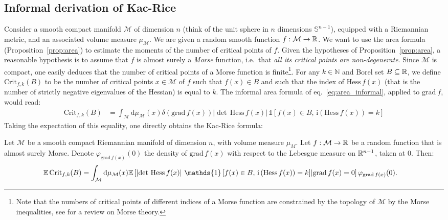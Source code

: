 \documentclass[amsmath,amssymb,nofootinbib,prd]{article}
\begin{document}
	\subsection{Informal derivation of Kac-Rice}
	
	Consider a smooth compact manifold $\mathcal{M}$ of dimension $n$ (think of the unit sphere in $n$ dimensions $\mathbb{S}^{n-1}$), equipped with a Riemannian metric, and an associated volume measure $\mu_{\mathcal{M}}$. 
	We are given a random smooth function $f : \mathcal{M} \to \mathbb{R}$. 
	We want to use the area formula (Proposition~\ref{prop:area}) to estimate the moments of the number of critical points of $f$.  
	Given the hypotheses of Proposition~\ref{prop:area}, a reasonable hypothesis is to assume that $f$ is almost surely a \emph{Morse} function, i.e.\ that \emph{all its critical points are non-degenerate}. 
	Since $\mathcal{M}$ is compact, one easily deduces that the number of critical points of a Morse function is finite\footnote{Note that the numbers of critical points of different indices of a Morse function are constrained by the topology of $\mathcal{M}$ by the Morse inequalities, see \cite{milnor1963morse} for a review on Morse theory.}. 
	For any $k \in \mathbb{N}$ and Borel set $B \subseteq \mathbb{R}$, we define $\mathrm{Crit}_{f,k}(B)$ to be the number of critical points $x \in \mathcal{M}$ of $f$ such that $f(x) \in B$
	 and such that the index of $\mathrm{Hess}\, f(x)$ (that is the number of strictly negative eigenvalues of the Hessian) is equal to $k$. 
	 The informal area formula of eq.~\eqref{eq:area_informal}, applied to $\mathrm{grad}\ f$, would read:
	\begin{align}
	\mathrm{Crit}_{f,k}(B) &= \int_{\mathcal{M}} \mathrm{d}\mu_{\mathcal{M}}(x) \delta\left(\mathrm{grad}\, f(x)\right) \left|\det \, \mathrm{Hess}\, f(x)\right| \, \mathds{1}\left[f(x) \in B,\, \mathrm{i}\left(\mathrm{Hess}\, f(x)\right) = k\right]
	\end{align}
	Taking the expectation of this equality, one directly obtains the Kac-Rice formula:
	\begin{proposition}\label{prop:KR}Let $\mathcal{M}$ be a smooth compact Riemannian manifold of dimension $n$, with volume measure $\mathcal{\mu}_M$. Let $f : \mathcal{M} \to \mathbb{R}$ be a random function 
		that is almost surely Morse.
		Denote  $\varphi_{\mathrm{grad}\, f(x)}(0)$ the density of $\mathrm{grad}\, f(x)$ with respect to the Lebesgue measure on $\mathbb{R}^{n-1}$, taken at $0$. Then:
	\begin{align*}
	\EE \, \mathrm{Crit}_{f,k}(B) &= \int_{\mathcal{M}} \mathrm{d}\mu_{\mathcal{M}}(x) \EE \left[\left|\det \, \mathrm{Hess}\, f(x)\right| \, \mathds{1}\left[f(x) \in B,\, \mathrm{i}\left(\mathrm{Hess}\, f(x)\right) = k\right] \middle| \mathrm{grad}\, f(x) = 0 \right] \varphi_{\mathrm{grad}\, f(x)}(0).
	\end{align*}
	\end{proposition}\vspace{0.cm}
	
\end{document}
